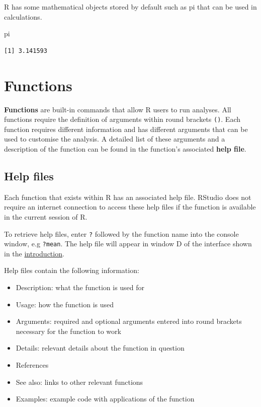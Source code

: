 \documentclass[
  letterpaper,
  DIV=11,
  numbers=noendperiod]{scrreprt}
\newenvironment{Shaded}{\begin{snugshade}}{\end{snugshade}}
\newcommand{\NormalTok}[1]{\textcolor[rgb]{0.00,0.23,0.31}{#1}}
\providecommand{\tightlist}{%
  \setlength{\itemsep}{0pt}\setlength{\parskip}{0pt}}\usepackage{longtable,booktabs,array}
\begin{document}
R has some mathematical objects stored by default such as pi that can be
used in calculations.

\begin{Shaded}
\begin{Highlighting}[]
\NormalTok{pi}
\end{Highlighting}
\end{Shaded}

\begin{verbatim}
[1] 3.141593
\end{verbatim}

\section{Functions}\label{functions}

\textbf{Functions} are built-in commands that allow R users to run
analyses. All functions require the definition of arguments within round
brackets \texttt{()}. Each function requires different information and
has different arguments that can be used to customise the analysis. A
detailed list of these arguments and a description of the function can
be found in the function's associated \textbf{help file}.

\subsection{Help files}\label{help-files}

Each function that exists within R has an associated help file. RStudio
does not require an internet connection to access these help files if
the function is available in the current session of R.

To retrieve help files, enter \texttt{?} followed by the function name
into the console window, e.g \texttt{?mean}. The help file will appear
in window D of the interface shown in the
\href{intro.qmd}{introduction}.

Help files contain the following information:

\begin{itemize}
\tightlist
\item
  Description: what the function is used for
\item
  Usage: how the function is used
\item
  Arguments: required and optional arguments entered into round brackets
  necessary for the function to work
\item
  Details: relevant details about the function in question
\item
  References
\item
  See also: links to other relevant functions
\item
  Examples: example code with applications of the function
\end{itemize}
\end{document}
